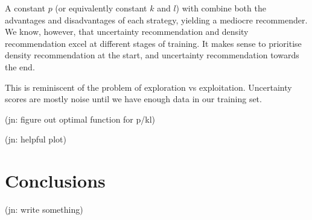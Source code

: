 \documentclass[11pt,twoside,openright]{report}
\newcommand\jn[1]{{\color{red}(jn: #1)}}
\begin{document}
A constant $p$ (or equivalently constant $k$ and $l$) with combine both the advantages and disadvantages of each strategy, yielding a mediocre recommender. We know, however, that uncertainty recommendation and density recommendation excel at different stages of training. It makes sense to prioritise density recommendation at the start, and uncertainty recommendation towards the end.

This is reminiscent of the problem of exploration vs exploitation. Uncertainty scores are mostly noise until we have enough data in our training set.

\jn{figure out optimal function for p/kl}

\jn{helpful plot}

\chapter{Conclusions}

\jn{write something}

\nocite{Bishop}
\nocite{KitchenSinks}
\nocite{GPBook}
\nocite{Deficiency}
\nocite{InducingVariables}
\nocite{OptimalDesign}
\nocite{Chris}
\nocite{*}
{}

\end{document}
